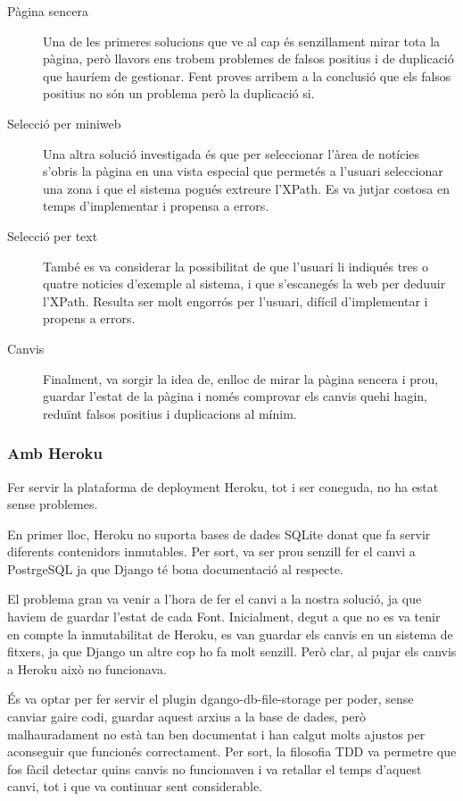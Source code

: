 \documentclass{article}
\begin{document}
\begin{description}
    \item[Pàgina sencera] Una de les primeres solucions que ve al cap és senzillament mirar tota la pàgina, però llavors ens trobem problemes de falsos positius i de duplicació que hauríem de gestionar. Fent proves arribem a la conclusió que els falsos positius no són un problema però la duplicació si.
    \item[Selecció per miniweb] Una altra solució investigada és que per seleccionar l'àrea de notícies s'obris la pàgina en una vista especial que permetés a l'usuari seleccionar una zona i que el sistema pogués extreure l'XPath. Es va jutjar costosa en temps d'implementar i propensa a errors.
    \item[Selecció per text] També es va considerar la possibilitat de que l'usuari li indiqués tres o quatre noticies d'exemple al sistema, i que s'escanegés la web per deduuir l'XPath. Resulta ser molt engorrós per l'usuari, difícil d'implementar i propens a errors.
    \item[Canvis] Finalment, va sorgir la idea de, enlloc de mirar la pàgina sencera i prou, guardar l'estat de la pàgina i només comprovar els canvis quehi hagin, reduïnt falsos positius i duplicacions al mínim.
\end{description}

\newpage

\subsubsection{Amb Heroku}

Fer servir la plataforma de deployment Heroku, tot i ser coneguda, no ha estat sense problemes.

En primer lloc, Heroku no suporta bases de dades SQLite donat que fa servir diferents contenidors inmutables. Per sort, va ser prou senzill fer el canvi a PostrgeSQL ja que Django té bona documentació al respecte.

El problema gran va venir a l'hora de fer el canvi a la nostra solució, ja que haviem de guardar l'estat de cada Font. Inicialment, degut a que no es va tenir en compte la inmutabilitat de Heroku, es van guardar els canvis en un sistema de fitxers, ja que Django un altre cop ho fa molt senzill. Però clar, al pujar els canvis a Heroku això no funcionava.

És va optar per fer servir el plugin dgango-db-file-storage per poder, sense canviar gaire codi, guardar aquest arxius a la base de dades, però malhauradament no està tan ben documentat i han calgut molts ajustos per aconseguir que funcionés correctament. Per sort, la filosofia TDD va permetre que fos fàcil detectar quins canvis no funcionaven i va retallar el temps d'aquest canvi, tot i que va continuar sent considerable.
\end{document}
